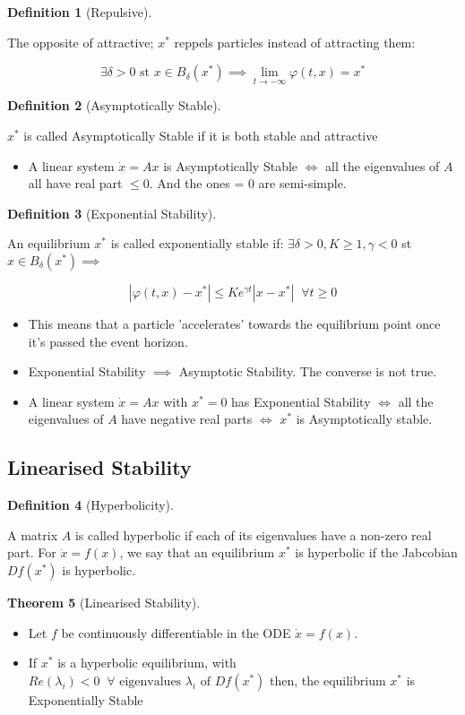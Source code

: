 \documentclass{article}
\newtheorem{thm}{Theorem}[section]
\newtheorem{defn}[thm]{Definition}
\begin{document}
\begin{defn}[Repulsive] \end{defn}
The opposite of attractive; $x^*$ reppels particles instead of attracting them:

\[\exists \delta > 0 \text{ st } x \in B_\delta(x^*) \implies \lim_{t\to-\infty}\varphi(t,x) = x^*\]

\begin{defn}[Asymptotically Stable]\end{defn}
$x^*$ is called Asymptotically Stable if it is both stable and attractive
\begin{itemize}
    \item A linear system $\dot x = Ax$  is Asymptotically Stable $\iff$ all the eigenvalues of $A$ all have real part $\leq 0$. And the ones = 0 are semi-simple.
\end{itemize}

\begin{defn}[Exponential Stability]
\end{defn}
An equilibrium $x^*$ is called exponentially stable if: $\exists \delta > 0, K \geq 1, \gamma < 0 $ st $ x \in B_\delta(x^*) \implies$

\[|\varphi(t, x) - x^*| \leq Ke^{\gamma t}|x - x^*| \;\; \forall t \geq 0 \]
\begin{itemize}
    \item This means that a particle 'accelerates' towards the equilibrium point once it's passed the event horizon.
    \item Exponential Stability $\implies$ Asymptotic Stability. The converse is not true.
    \item A linear system $\dot x = Ax$ with $x^* = 0$ has Exponential Stability $\iff$ all the eigenvalues of $A$ have negative real parts $\iff$ $x^*$ is Asymptotically stable. 
\end{itemize}

\subsection{Linearised Stability}

\begin{defn}[Hyperbolicity]    
\end{defn}
A matrix $A$ is called hyperbolic if each of its eigenvalues have a non-zero real part. For $\dot x = f(x)$, we say that an equilibrium $x^*$ is hyperbolic if the Jabcobian $Df(x^*)$ is hyperbolic.

\begin{thm}[Linearised Stability]
\end{thm}
\begin{itemize}
    \item Let $f$ be continuously differentiable in the ODE $\dot x = f(x)$.
    \item If $x^*$ is a hyperbolic equilibrium, with $Re(\lambda_i) <0\;\; \forall \text{ eigenvalues } \lambda_i \text{ of } Df(x^*)$ then, the equilibrium $x^*$ is Exponentially Stable
    
\end{itemize}
\end{document}
